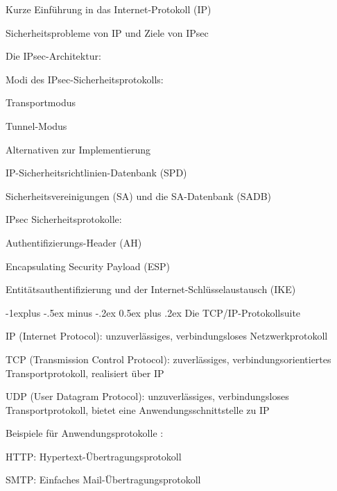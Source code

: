 \documentclass[a4paper]{article}
\makeatletter
\renewcommand{\subsection}{\@startsection{subsection}{2}{0mm}%
 {-1explus -.5ex minus -.2ex}%
 {0.5ex plus .2ex}%
 {\normalfont\normalsize\bfseries}}
\makeatother
\begin{document}
\begin{multicols}{3}
      \begin{itemize*}
            \item Kurze Einführung in das Internet-Protokoll (IP)
            \item Sicherheitsprobleme von IP und Ziele von IPsec
            \item Die IPsec-Architektur:
            \begin{itemize*}
                  \item Modi des IPsec-Sicherheitsprotokolls:
                  \begin{itemize*} \item Transportmodus \item Tunnel-Modus \end{itemize*}
                  \item Alternativen zur Implementierung
                  \item IP-Sicherheitsrichtlinien-Datenbank (SPD)
                  \item Sicherheitsvereinigungen (SA) und die SA-Datenbank (SADB)
            \end{itemize*}
            \item IPsec Sicherheitsprotokolle:
            \begin{itemize*}
                  \item Authentifizierungs-Header (AH)
                  \item Encapsulating Security Payload (ESP)
            \end{itemize*}
            \item Entitätsauthentifizierung und der Internet-Schlüsselaustausch (IKE)
      \end{itemize*}


      \subsection{Die TCP/IP-Protokollsuite}

      \begin{itemize*}
            \item IP (Internet Protocol): unzuverlässiges, verbindungsloses
            Netzwerkprotokoll
            \item TCP (Transmission Control Protocol): zuverlässiges,
            verbindungsorientiertes Transportprotokoll, realisiert über IP
            \item UDP (User Datagram Protocol): unzuverlässiges, verbindungsloses
            Transportprotokoll, bietet eine Anwendungsschnittstelle zu IP
            \item Beispiele für Anwendungsprotokolle :
            \begin{itemize*}
                  \item HTTP: Hypertext-Übertragungsprotokoll
                  \item SMTP: Einfaches Mail-Übertragungsprotokoll
            \end{itemize*}
      \end{itemize*}



\end{multicols}
\end{document}

